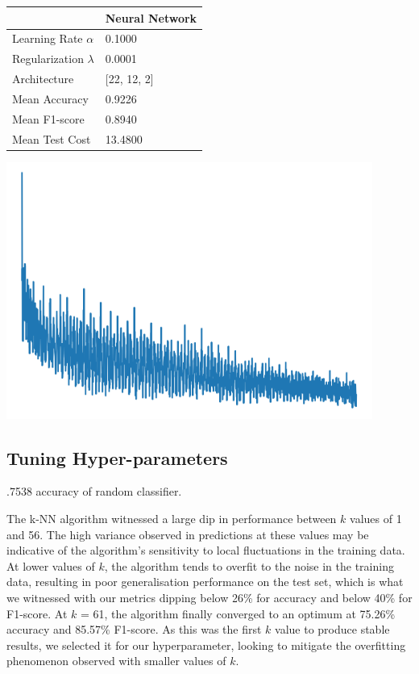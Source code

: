 \documentclass{article}
\begin{document}
\begin{minipage}{0.49\textwidth}
    \centering
    
    \begin{tabular}{ll}
        \toprule
        & Neural Network \\
        \midrule
        Learning Rate $\alpha$ & 0.1000 \\
        Regularization $\lambda$ & 0.0001 \\
        Architecture & [22, 12, 2] \\
        Mean Accuracy & 0.9226 \\
        Mean F1-score & 0.8940 \\
        Mean Test Cost & 13.4800 \\
        \bottomrule
    \end{tabular}

        
\end{minipage}
\hfill
\begin{minipage}{0.49\textwidth}
    \centering
    \includegraphics*[width=0.9\textwidth]{./src/figures/Parikinson's_train_cost.png}
\end{minipage}
\subsection*{Tuning Hyper-parameters}
.7538 accuracy of random classifier.

The k-NN algorithm witnessed a large dip in performance between $k$ values of 1 and 56.
The high variance observed in predictions at these values may be indicative of 
the algorithm's sensitivity to local fluctuations in the training data. 
At lower values of $k$, the algorithm tends to overfit to the noise in the training data, 
resulting in poor generalisation performance on the test set,
which is what we witnessed with our metrics dipping below 26\% for accuracy and below 40\% for F1-score.
At $k$ = 61, the algorithm finally converged to an optimum at 75.26\% accuracy and 85.57\% F1-score.
As this was the first $k$ value to produce stable results, we selected it for our hyperparameter, 
looking to mitigate the overfitting phenomenon observed with smaller values of $k$.
\end{document}
